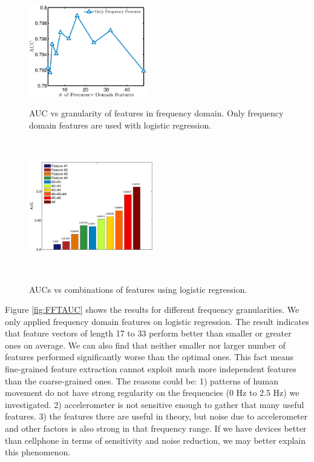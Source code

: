 \documentclass{article} %
\begin{document}
\begin{figure}
    \hspace{-0.5cm}
    \begin{minipage}[t]{0.02\textwidth}~
    \end{minipage}
    \begin{minipage}[t]{0.47\textwidth}
    \centering
    \includegraphics[height=40mm]{fig/fftauc.eps}
    \caption{AUC vs granularity of features in frequency domain. Only frequency domain features are used with logistic regression.}
    \label{fig:FFTAUC}
    \end{minipage}
    \begin{minipage}[t]{0.02\textwidth}~
    \end{minipage}
    \begin{minipage}[t]{0.47\textwidth}
    \centering
    \includegraphics[height=40mm]{fig/feature}\\
    \caption{AUCs vs combinations of features using logistic regression.}
    \label{fig:feature}
    \end{minipage}
    \begin{minipage}[t]{0.02\textwidth}~
    \end{minipage}%
 \end{figure}

Figure \ref{fig:FFTAUC} shows the results for different frequency granularities. We only applied frequency domain features on logistic regression. The result indicates that feature vectors of length 17 to 33 perform better than smaller or greater ones on average. We can also find that neither smaller nor larger number of features performed significantly worse than the optimal ones. This fact means fine-grained feature extraction cannot exploit much more independent features than the coarse-grained ones. The reasons could be: 1) patterns of human movement do not have strong regularity on the frequencies (0 Hz to 2.5 Hz) we investigated. 2) accelerometer is not sensitive enough to gather that many useful features. 3) the features there are useful in theory, but noise due to accelerometer and other factors is also strong in that frequency range. If we have devices better than cellphone in terms of sensitivity and noise reduction, we may better explain this phenomenon.
\end{document}
